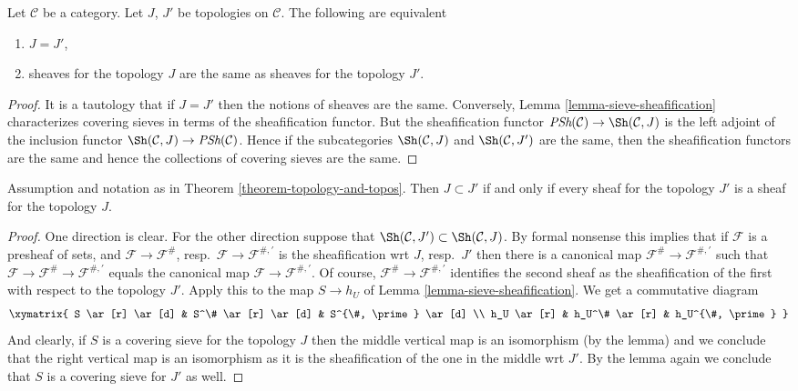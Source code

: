\begin{theorem}
\label{theorem-topology-and-topos}
Let $\mathcal{C}$ be a category.
Let $J$, $J'$ be topologies on $\mathcal{C}$.
The following are equivalent
\begin{enumerate}
\item $J = J'$,
\item sheaves for the topology $J$ are the same as
sheaves for the topology $J'$.
\end{enumerate}
\end{theorem}

\begin{proof}
It is a tautology that if $J = J'$ then the notions of sheaves
are the same. Conversely, Lemma \ref{lemma-sieve-sheafification}
characterizes covering sieves in terms of the sheafification
functor. But the sheafification functor
$\textit{PSh}(\mathcal{C}) \to \Sh(\mathcal{C}, J)$
is the left adjoint of the inclusion functor
$\Sh(\mathcal{C}, J) \to \textit{PSh}(\mathcal{C})$.
Hence if the subcategories
$\Sh(\mathcal{C}, J)$ and
$\Sh(\mathcal{C}, J')$ are the same, then the sheafification
functors are the same and hence the collections of covering
sieves are the same.
\end{proof}

\begin{lemma}
\label{lemma-finer-topology}
Assumption and notation as in Theorem \ref{theorem-topology-and-topos}.
Then $J \subset J'$ if and only if every sheaf for the
topology $J'$ is a sheaf for the topology $J$.
\end{lemma}

\begin{proof}
One direction is clear. For the other direction suppose that
$\Sh(\mathcal{C}, J') \subset \Sh(\mathcal{C}, J)$.
By formal nonsense this implies
that if $\mathcal{F}$ is a presheaf of sets,
and $\mathcal{F} \to \mathcal{F}^\#$,
resp.\ $\mathcal{F} \to \mathcal{F}^{\#, \prime}$
is the sheafification wrt $J$, resp.\ $J'$ then there
is a canonical map $\mathcal{F}^\# \to \mathcal{F}^{\#, \prime}$
such that
$\mathcal{F} \to \mathcal{F}^\# \to \mathcal{F}^{\#, \prime}$
equals the canonical map $\mathcal{F} \to \mathcal{F}^{\#, \prime}$.
Of course, $\mathcal{F}^\# \to \mathcal{F}^{\#, \prime}$
identifies the second sheaf as the sheafification of the first
with respect to the topology $J'$.
Apply this to the map $S \to h_U$ of
Lemma \ref{lemma-sieve-sheafification}. We get a commutative
diagram
$$
\xymatrix{
S \ar[r] \ar[d] &
S^\# \ar[r] \ar[d] &
S^{\#, \prime} \ar[d] \\
h_U \ar[r] &
h_U^\# \ar[r] &
h_U^{\#, \prime}
}
$$
And clearly, if $S$ is a covering sieve for the topology $J$
then the middle vertical map is an isomorphism (by the lemma)
and we conclude that the right vertical map is an isomorphism as
it is the sheafification of the one in the middle wrt $J'$.
By the lemma again we conclude that $S$ is a covering sieve
for $J'$ as well.
\end{proof}




